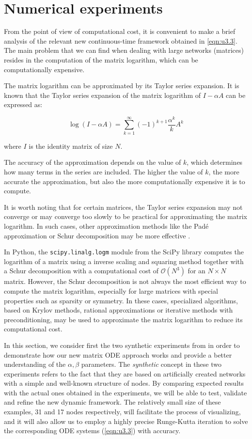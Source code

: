 \chapter{Numerical experiments}
\label{chap:expe}

From the point of view of computational cost, it is convenient to make a brief analysis of the relevant new continuous-time framework obtained in \eqref{eqn:u3.3}. The main problem that we can find when dealing with large networks (matrices) resides in the computation of the matrix logarithm, which can be computationally expensive.

The matrix logarithm can be approximated by its Taylor series expansion. It is known that the Taylor series expansion of the matrix logarithm of $I - \alpha A$ can be expressed as:

$$\log(I - \alpha A) = \sum_{k=1}^{\infty} (-1)^{k+1}\frac{\alpha^k}{k}A^k$$

where $I$ is the identity matrix of size $N$.

The accuracy of the approximation depends on the value of $k$, which determines how many terms in the series are included. The higher the value of $k$, the more accurate the approximation, but also the more computationally expensive it is to compute.

It is worth noting that for certain matrices, the Taylor series expansion may not converge or may converge too slowly to be practical for approximating the matrix logarithm. In such cases, other approximation methods like the Padé approximation or Schur decomposition may be more effective \cite[Ch.\ 11]{higham2008functions}.

In Python, the \texttt{scipy.linalg.logm} module from the SciPy library computes the logarithm of a matrix using a inverse scaling and squaring method together with a Schur decomposition with a computational cost of $\mathcal{O}(N^3)$ for an $N \times N$ matrix. However, the Schur decomposition is not always the most efficient way to compute the matrix logarithm, especially for large matrices with special properties such as sparsity or symmetry. In these cases, specialized algorithms, based on Krylov methods, rational approximations or iterative methods with preconditioning, may be used to approximate the matrix logarithm to reduce its computational cost. 

In this section, we consider first the two synthetic experiments from \cite{grindrod2014dynamical} in order to demonstrate how our new matrix ODE approach works and provide a better understanding of the $\alpha,\beta$ parameters. The \textit{synthetic} concept in these two experiments refers to the fact that they are based on artificially created networks with a simple and well-known structure of nodes. By comparing expected results with the actual ones obtained in the experiments, we will be able to test, validate and refine the new dynamic framework. The relatively small size of these examples, 31 and 17 nodes respectively, will facilitate the process of visualizing, and it will also allow us to employ a highly precise Runge-Kutta iteration to solve the corresponding ODE systems (\ref{eqn:u3.3}) with accuracy.

